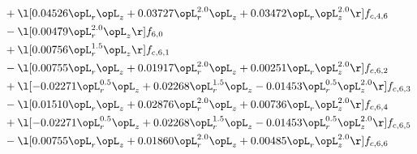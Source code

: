 \begin{alignat}{2}
& + \l[  0.04526 \opL_r \opL_z +  0.03727 \opL_r^{2.0} \opL_z +  0.03472 \opL_r \opL_z^{2.0}  \r] f_{c,4,6} \nonumber \\ 
& - \l[  0.00479 \opL_r^{2.0} \opL_z  \r] f_{6,0} \nonumber \\ 
& + \l[  0.00756 \opL_r^{1.5} \opL_z  \r] f_{c,6,1} \nonumber \\ 
& - \l[  0.00755 \opL_r \opL_z +  0.01917 \opL_r^{2.0} \opL_z +  0.00251 \opL_r \opL_z^{2.0}  \r] f_{c,6,2} \nonumber \\ 
& + \l[  -0.02271 \opL_r^{0.5} \opL_z +  0.02268 \opL_r^{1.5} \opL_z   -0.01453 \opL_r^{0.5} \opL_z^{2.0}  \r] f_{c,6,3} \nonumber \\ 
& - \l[  0.01510 \opL_r \opL_z +  0.02876 \opL_r^{2.0} \opL_z +  0.00736 \opL_r \opL_z^{2.0}  \r] f_{c,6,4} \nonumber \\ 
& + \l[  -0.02271 \opL_r^{0.5} \opL_z +  0.02268 \opL_r^{1.5} \opL_z   -0.01453 \opL_r^{0.5} \opL_z^{2.0}  \r] f_{c,6,5} \nonumber \\ 
& - \l[  0.00755 \opL_r \opL_z +  0.01860 \opL_r^{2.0} \opL_z +  0.00485 \opL_r \opL_z^{2.0}  \r] f_{c,6,6} \nonumber \\ 
\end{alignat} 


